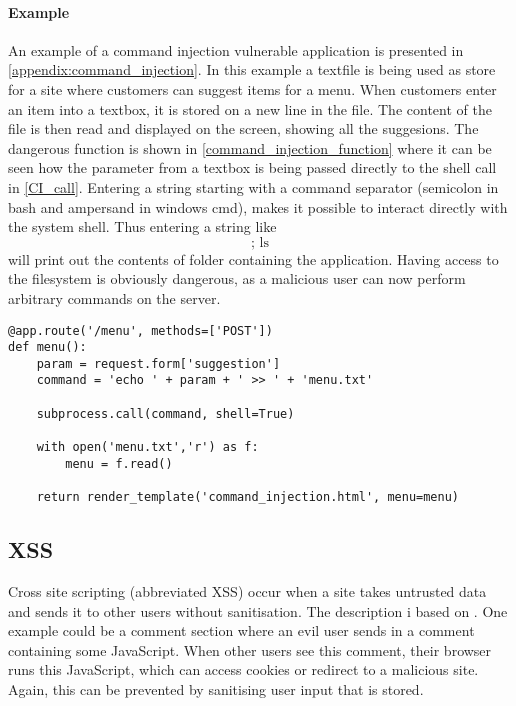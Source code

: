 \paragraph{Example}
An example of a command injection vulnerable application is presented in \cref{appendix:command_injection}.
In this example a textfile is being used as store for a site where customers can suggest items for a menu.
When customers enter an item into a textbox, it is stored on a new line in the file.
The content of the file is then read and displayed on the screen, showing all the suggesions.
The dangerous function is shown in \cref{command_injection_function} where it can be seen how the parameter from a textbox is being passed directly to the shell call in \cref{CI_call}.
Entering a string starting with a command separator (semicolon in bash and ampersand in windows cmd), makes it possible to interact directly with the system shell.
Thus entering a string like
\[ \text{; ls} \]
will print out the contents of folder containing the application.
Having access to the filesystem is obviously dangerous, as a malicious user can now perform arbitrary commands on the server.

\begin{lstlisting}[style=python, caption={The culprit making command injection possible. Param is not being escaped before being executed by the shell.}, label={command_injection_function}, firstnumber=13]
@app.route('/menu', methods=['POST'])
def menu():
    param = request.form['suggestion']
    command = 'echo ' + param + ' >> ' + 'menu.txt'

    subprocess.call(command, shell=True)

    with open('menu.txt','r') as f:
        menu = f.read()

    return render_template('command_injection.html', menu=menu)

\end{lstlisting}

\subsection{XSS}\label{vulnerabilities:xss}
Cross site scripting (abbreviated XSS) occur when a site takes untrusted data and sends it to other users without sanitisation.
The description i based on \citet{crosssitescripting}.
One example could be a comment section where an evil user sends in a comment containing some JavaScript.
When other users see this comment, their browser runs this JavaScript, which can access cookies or redirect to a malicious site.
Again, this can be prevented by sanitising user input that is stored.

